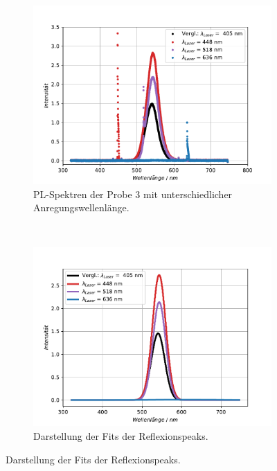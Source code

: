 \begin{figure}[hbtp]
\centering
\caption{Messungen und Ergebnisse zur Probe 3.}
	\begin{subfigure}[t]{0.45\textwidth}
	\includegraphics[width=\textwidth]{Plots/aufgabe2P3.pdf}
	\caption{PL-Spektren der Probe 3 mit unterschiedlicher Anregungswellenl\"{a}nge.}
	\label{}
	\end{subfigure}
	~
	\begin{subfigure}[t]{0.45\textwidth}
	\includegraphics[width=\textwidth]{Plots/aufgabe2P3_fit_1s.pdf}
	\caption{Darstellung der Fits der Reflexionspeaks.}
	\label{}
	\end{subfigure}
\label{}
\end{figure}


